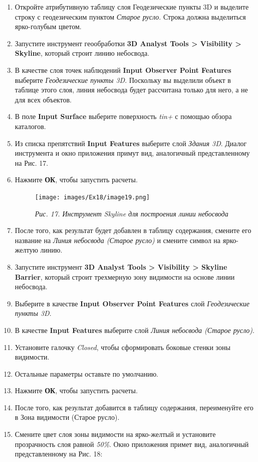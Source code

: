 \documentclass[12pt,]{book}
\begin{document}
\begin{enumerate}
\def\labelenumi{\arabic{enumi}.}
\item
  Откройте атрибутивную таблицу слоя Геодезические пункты 3D и выделите строку с геодезическим пунктом \emph{Старое русло}. Строка должна выделиться ярко-голубым цветом.
\item
  Запустите инструмент геообработки \textbf{3D Analyst Tools \textgreater{} Visibility \textgreater{} Skyline}, который строит линию небосвода.
\item
  В качестве слоя точек наблюдений \textbf{Input Observer Point Features} выберите \emph{Геодезические пункты 3D}. Поскольку вы выделили объект в таблице этого слоя, линия небосвода будет рассчитана только для него, а не для всех объектов.
\item
  В поле \textbf{Input Surface} выберите поверхность \emph{tin+} с помощью обзора каталогов.
\item
  Из списка препятствий \textbf{Input Features} выберите слой \emph{Здания 3D}. Диалог инструмента и окно приложения примут вид, аналогичный представленному на Рис. 17.
\item
  Нажмите \textbf{ОК}, чтобы запустить расчеты.

  \begin{figure}
  \centering
  \texttt{[image: images/Ex18/image19.png]}
  \caption{\emph{Рис. 17. Инструмент Skyline для построения линии небосвода}}
  \end{figure}
\item
  После того, как результат будет добавлен в таблицу содержания, смените его название на \emph{Линия небосвода (Старое русло)} и смените символ на ярко-желтую линию.
\item
  Запустите инструмент \textbf{3D Analyst Tools \textgreater{} Visibility \textgreater{} Skyline Barrier}, который строит трехмерную зону видимости на основе линии небосвода.
\item
  Выберите в качестве \textbf{Input Observer Point Features} слой \emph{Геодезические пункты 3D}.
\item
  В качестве \textbf{Input Features} выберите слой \emph{Линия небосвода (Старое русло)}.
\item
  Установите галочку \emph{Closed}, чтобы сформировать боковые стенки зоны видимости.
\item
  Остальные параметры оставьте по умолчанию.
\item
  Нажмите \textbf{ОК}, чтобы запустить расчеты.
\item
  После того, как результат добавится в таблицу содержания, переименуйте его в Зона видимости (Старое русло).
\item
  Смените цвет слоя зоны видимости на ярко-желтый и установите прозрачность слоя равной \emph{50\%}. Окно приложения примет вид, аналогичный представленному на Рис. 18:


\end{enumerate}
\end{document}
